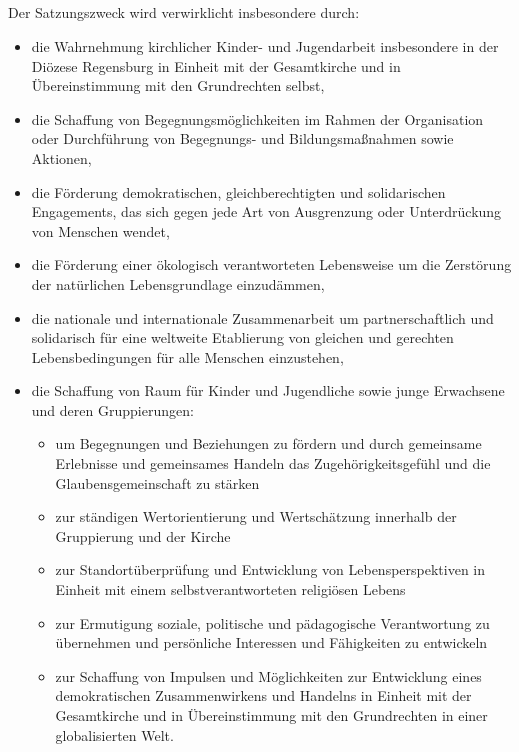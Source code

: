 \documentclass[12pt]{report}
\newcommand{\nocontentsline}[3]{}
\newcommand{\tocless}[2]{\bgroup\let\addcontentsline=\nocontentsline#1{#2}\egroup}
\begin{document}
\begin{justify}
\tocless\subsection{}
Der Satzungszweck wird verwirklicht insbesondere durch:
\begin{itemize}
  \item die Wahrnehmung kirchlicher Kinder- und Jugendarbeit insbesondere in der Diözese Regensburg
        in Einheit mit der Gesamtkirche und in Übereinstimmung mit den Grundrechten selbst,
  \item die Schaffung von Begegnungsmöglichkeiten im Rahmen der Organisation oder Durchführung von
        Begegnungs- und Bildungsmaßnahmen sowie Aktionen,
  \item die Förderung demokratischen, gleichberechtigten und solidarischen Engagements, das sich
        gegen jede Art von Ausgrenzung oder Unterdrückung von Menschen wendet,
  \item die Förderung einer ökologisch verantworteten Lebensweise um die Zerstörung der
          natürlichen Lebensgrundlage einzudämmen,
  \item die nationale und internationale Zusammenarbeit um partnerschaftlich und solidarisch für
        eine weltweite Etablierung von gleichen und gerechten Lebensbedingungen für alle Menschen einzustehen,
  \item die Schaffung von Raum für Kinder und Jugendliche sowie junge Erwachsene und deren
        Gruppierungen:
    \begin{itemize}
      \item um Begegnungen und Beziehungen zu fördern und durch gemeinsame Erlebnisse und gemeinsames Handeln
            das Zugehörigkeitsgefühl und die Glaubensgemeinschaft zu stärken
      \item zur ständigen Wertorientierung und Wertschätzung innerhalb der Gruppierung und der Kirche
      \item zur Standortüberprüfung und Entwicklung von Lebensperspektiven in Einheit mit einem 
            selbstverantworteten religiösen Lebens
      \item zur Ermutigung soziale, politische und pädagogische Verantwortung zu übernehmen und  
            persönliche Interessen und Fähigkeiten zu entwickeln
      \item zur Schaffung von Impulsen und Möglichkeiten zur Entwicklung eines demokratischen Zusammenwirkens
            und Handelns in Einheit mit der Gesamtkirche und in Übereinstimmung 
            mit den Grundrechten in einer globalisierten Welt.

\end{itemize}
\end{itemize}
\end{justify}
\end{document}
